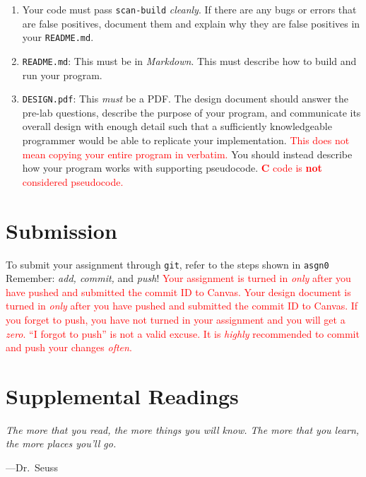 \documentclass[11pt]{article}
\begin{document}
\begin{enumerate}
  \item Your code must pass \texttt{scan-build} \emph{cleanly}. If there
    are any bugs or errors that are false positives, document them and
    explain why they are false positives in your \texttt{README.md}.

  \item \texttt{README.md}: This must be in \emph{Markdown}. This must describe
    how to build and run your program.

  \item \texttt{DESIGN.pdf}: This \emph{must} be a PDF\@. The design document
    should answer the pre-lab questions, describe the purpose of your program,
    and communicate its overall design with enough detail such that a sufficiently
    knowledgeable programmer would be able to replicate your implementation.
    \textcolor{red}{This does not mean copying your entire program in verbatim.}
    You should instead describe how your program works with supporting pseudocode.
    \textcolor{red}{\textbf{C} code is \textbf{not} considered pseudocode.}
\end{enumerate}

\section{Submission}

To submit your assignment through \texttt{git}, refer to the steps shown in
\texttt{asgn0} Remember: \emph{add, commit,} and \emph{push}!
\textcolor{red}{Your assignment is turned in \emph{only} after you have pushed
and submitted the commit ID to Canvas. Your design document is turned in \emph{only}
after you have pushed and submitted the commit ID to Canvas.
If you forget to push, you have not turned in your assignment and you will get a
\emph{zero}. ``I forgot to push'' is not a valid excuse. It is \emph{highly}
recommended to commit and push your changes \emph{often}.}

\section{Supplemental Readings}

\epigraph{\emph{The more that you read, the more things you will know. The
more that you learn, the more places you'll go.}}{---Dr.\ Seuss}
\end{document}

